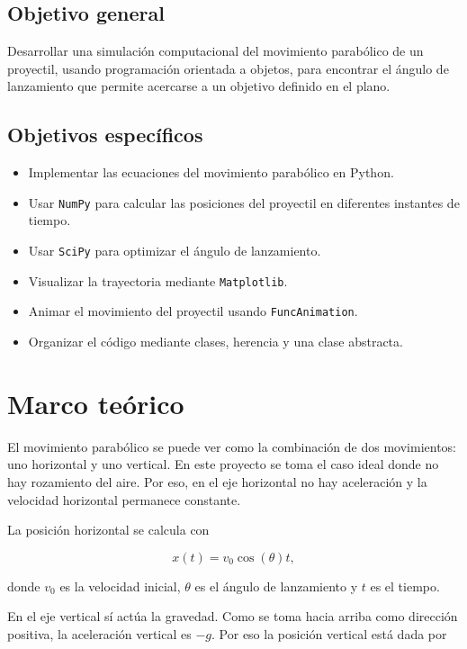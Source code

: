 \documentclass[12pt,letterpaper]{article}
\begin{document}
\subsection{Objetivo general}

Desarrollar una simulaci\'{o}n computacional del movimiento parab\'{o}lico de un proyectil, usando programaci\'{o}n orientada a objetos, para encontrar el \'{a}ngulo de lanzamiento que permite acercarse a un objetivo definido en el plano.

\subsection{Objetivos espec\'{i}ficos}

\begin{itemize}
    \item Implementar las ecuaciones del movimiento parab\'{o}lico en Python.
    \item Usar \texttt{NumPy} para calcular las posiciones del proyectil en diferentes instantes de tiempo.
    \item Usar \texttt{SciPy} para optimizar el \'{a}ngulo de lanzamiento.
    \item Visualizar la trayectoria mediante \texttt{Matplotlib}.
    \item Animar el movimiento del proyectil usando \texttt{FuncAnimation}.
    \item Organizar el c\'{o}digo mediante clases, herencia y una clase abstracta.
\end{itemize}

\section{Marco te\'{o}rico}

El movimiento parab\'{o}lico se puede ver como la combinaci\'{o}n de dos movimientos: uno horizontal y uno vertical. En este proyecto se toma el caso ideal donde no hay rozamiento del aire. Por eso, en el eje horizontal no hay aceleraci\'{o}n y la velocidad horizontal permanece constante.

La posici\'{o}n horizontal se calcula con

\begin{equation}
x(t)=v_0\cos(\theta)t,
\end{equation}

donde \(v_0\) es la velocidad inicial, \(\theta\) es el \'{a}ngulo de lanzamiento y \(t\) es el tiempo.

En el eje vertical s\'{i} act\'{u}a la gravedad. Como se toma hacia arriba como direcci\'{o}n positiva, la aceleraci\'{o}n vertical es \(-g\). Por eso la posici\'{o}n vertical est\'{a} dada por
\end{document}
